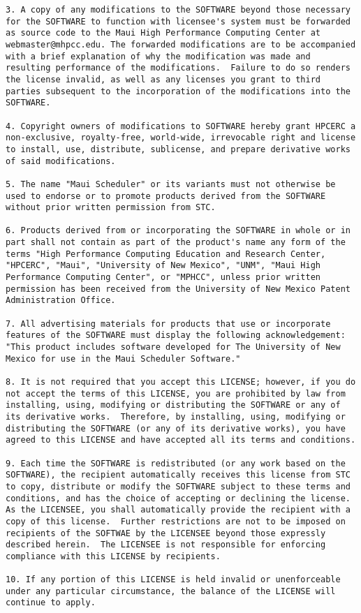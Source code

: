 \begin{verbatim}
3. A copy of any modifications to the SOFTWARE beyond those necessary
for the SOFTWARE to function with licensee's system must be forwarded
as source code to the Maui High Performance Computing Center at
webmaster@mhpcc.edu. The forwarded modifications are to be accompanied
with a brief explanation of why the modification was made and
resulting performance of the modifications.  Failure to do so renders
the license invalid, as well as any licenses you grant to third
parties subsequent to the incorporation of the modifications into the
SOFTWARE.

4. Copyright owners of modifications to SOFTWARE hereby grant HPCERC a
non-exclusive, royalty-free, world-wide, irrevocable right and license
to install, use, distribute, sublicense, and prepare derivative works
of said modifications.

5. The name "Maui Scheduler" or its variants must not otherwise be
used to endorse or to promote products derived from the SOFTWARE
without prior written permission from STC.

6. Products derived from or incorporating the SOFTWARE in whole or in
part shall not contain as part of the product's name any form of the
terms "High Performance Computing Education and Research Center,
"HPCERC", "Maui", "University of New Mexico", "UNM", "Maui High
Performance Computing Center", or "MPHCC", unless prior written
permission has been received from the University of New Mexico Patent
Administration Office.

7. All advertising materials for products that use or incorporate
features of the SOFTWARE must display the following acknowledgement:
"This product includes software developed for The University of New
Mexico for use in the Maui Scheduler Software."

8. It is not required that you accept this LICENSE; however, if you do
not accept the terms of this LICENSE, you are prohibited by law from
installing, using, modifying or distributing the SOFTWARE or any of
its derivative works.  Therefore, by installing, using, modifying or
distributing the SOFTWARE (or any of its derivative works), you have
agreed to this LICENSE and have accepted all its terms and conditions.

9. Each time the SOFTWARE is redistributed (or any work based on the
SOFTWARE), the recipient automatically receives this license from STC
to copy, distribute or modify the SOFTWARE subject to these terms and
conditions, and has the choice of accepting or declining the license.
As the LICENSEE, you shall automatically provide the recipient with a
copy of this license.  Further restrictions are not to be imposed on
recipients of the SOFTWAE by the LICENSEE beyond those expressly
described herein.  The LICENSEE is not responsible for enforcing
compliance with this LICENSE by recipients.

10. If any portion of this LICENSE is held invalid or unenforceable
under any particular circumstance, the balance of the LICENSE will
continue to apply.  \end{verbatim}

